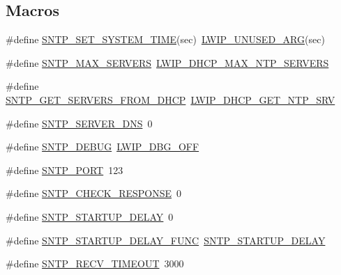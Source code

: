 \subsection*{Macros}
\begin{DoxyCompactItemize}
\item 
\#define \hyperlink{group__sntp__opts_gafe340b98c52dedcbc041267fe13b2da6}{S\+N\+T\+P\+\_\+\+S\+E\+T\+\_\+\+S\+Y\+S\+T\+E\+M\+\_\+\+T\+I\+ME}(sec)~\hyperlink{group__compiler__abstraction_ga70624a5deb8b9199406372a7f3603ecf}{L\+W\+I\+P\+\_\+\+U\+N\+U\+S\+E\+D\+\_\+\+A\+RG}(sec)
\item 
\#define \hyperlink{group__sntp__opts_ga5d9dc0827f402849f5c18d44e311dbc2}{S\+N\+T\+P\+\_\+\+M\+A\+X\+\_\+\+S\+E\+R\+V\+E\+RS}~\hyperlink{group__lwip__opts__dhcp_ga9d014e3f7dc9e1e7c7decd8652ba65e2}{L\+W\+I\+P\+\_\+\+D\+H\+C\+P\+\_\+\+M\+A\+X\+\_\+\+N\+T\+P\+\_\+\+S\+E\+R\+V\+E\+RS}
\item 
\#define \hyperlink{group__sntp__opts_ga961a61eef942ab5378cff1e3742b3ade}{S\+N\+T\+P\+\_\+\+G\+E\+T\+\_\+\+S\+E\+R\+V\+E\+R\+S\+\_\+\+F\+R\+O\+M\+\_\+\+D\+H\+CP}~\hyperlink{group__lwip__opts__dhcp_ga2cc18315edcd5ffc083d1256f7d22a83}{L\+W\+I\+P\+\_\+\+D\+H\+C\+P\+\_\+\+G\+E\+T\+\_\+\+N\+T\+P\+\_\+\+S\+RV}
\item 
\#define \hyperlink{group__sntp__opts_gaef477c145ae404d77188b26b79b6996f}{S\+N\+T\+P\+\_\+\+S\+E\+R\+V\+E\+R\+\_\+\+D\+NS}~0
\item 
\#define \hyperlink{group__sntp__opts_ga25c6f9c14c17e218d110d826b09f8d91}{S\+N\+T\+P\+\_\+\+D\+E\+B\+UG}~\hyperlink{group__debugging__levels_gadab1cdc3f45939a3a5c9a3d7e04987e1}{L\+W\+I\+P\+\_\+\+D\+B\+G\+\_\+\+O\+FF}
\item 
\#define \hyperlink{group__sntp__opts_gacbee62c27f54371fc2c5259a834a0f9b}{S\+N\+T\+P\+\_\+\+P\+O\+RT}~123
\item 
\#define \hyperlink{group__sntp__opts_ga7d4e12d90912d486e64f289d7f3ca446}{S\+N\+T\+P\+\_\+\+C\+H\+E\+C\+K\+\_\+\+R\+E\+S\+P\+O\+N\+SE}~0
\item 
\#define \hyperlink{group__sntp__opts_ga22017d43da7d4bf8d42e786b4ced4dfa}{S\+N\+T\+P\+\_\+\+S\+T\+A\+R\+T\+U\+P\+\_\+\+D\+E\+L\+AY}~0
\item 
\#define \hyperlink{group__sntp__opts_gae082c2f3044d500ca5e1be1d4928de75}{S\+N\+T\+P\+\_\+\+S\+T\+A\+R\+T\+U\+P\+\_\+\+D\+E\+L\+A\+Y\+\_\+\+F\+U\+NC}~\hyperlink{group__sntp__opts_ga22017d43da7d4bf8d42e786b4ced4dfa}{S\+N\+T\+P\+\_\+\+S\+T\+A\+R\+T\+U\+P\+\_\+\+D\+E\+L\+AY}
\item 
\#define \hyperlink{group__sntp__opts_ga44cf26b9b19832d88599244711a12d08}{S\+N\+T\+P\+\_\+\+R\+E\+C\+V\+\_\+\+T\+I\+M\+E\+O\+UT}~3000

\end{DoxyCompactItemize}
